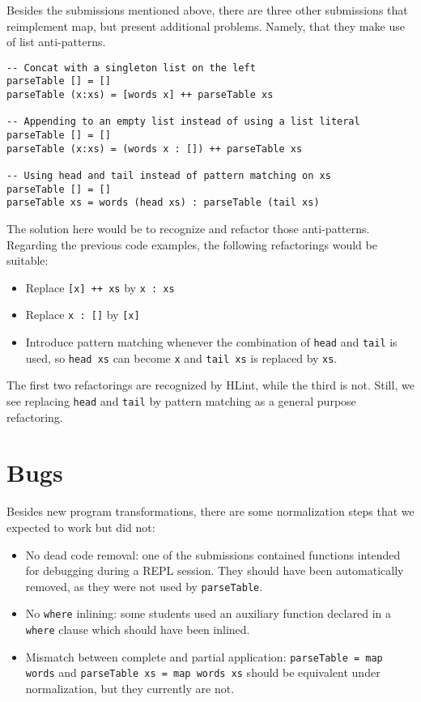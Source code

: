 Besides the submissions mentioned above, there are three other submissions that reimplement map, but present additional problems. Namely, that they make use of list anti-patterns.

\begin{verbatim}
-- Concat with a singleton list on the left
parseTable [] = []
parseTable (x:xs) = [words x] ++ parseTable xs

-- Appending to an empty list instead of using a list literal
parseTable [] = []
parseTable (x:xs) = (words x : []) ++ parseTable xs

-- Using head and tail instead of pattern matching on xs
parseTable [] = []
parseTable xs = words (head xs) : parseTable (tail xs)
\end{verbatim}

The solution here would be to recognize and refactor those anti-patterns. Regarding the previous code examples, the following refactorings would be suitable:

\begin{itemize}
    \item Replace \texttt{[x] ++ xs} by \texttt{x : xs}
    \item Replace \texttt{x : []} by \texttt{[x]}
    \item Introduce pattern matching whenever the combination of \texttt{head} and \texttt{tail} is used, so \texttt{head xs} can become \texttt{x} and \texttt{tail xs} is replaced by \texttt{xs}.
\end{itemize}

The first two refactorings are recognized by HLint, while the third is not. Still, we see replacing \texttt{head} and \texttt{tail} by pattern matching as a general purpose refactoring.

\section{Bugs}

Besides new program transformations, there are some normalization steps that we expected to work but did not:

\begin{itemize}
    \item No dead code removal: one of the submissions contained functions intended for debugging during a REPL session. They should have been automatically removed, as they were not used by \texttt{parseTable}.
    \item No \texttt{where} inlining: some students used an auxiliary function declared in a \texttt{where} clause which should have been inlined.
    \item Mismatch between complete and partial application: \texttt{parseTable = map words} and \texttt{parseTable xs = map words xs} should be equivalent under normalization, but they currently are not.
\end{itemize}

